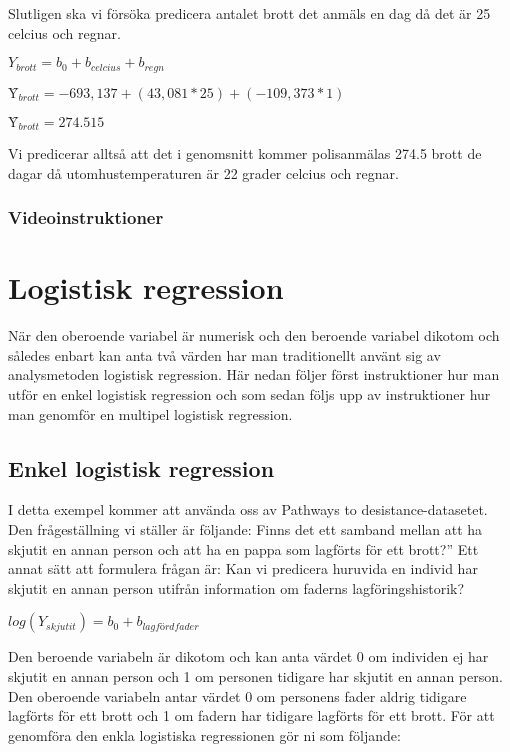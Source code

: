 \documentclass[
]{book}
\begin{document}
Slutligen ska vi försöka predicera antalet brott det anmäls en dag då det är 25 celcius och regnar.

\(Y_{brott} = b_0 + b_{celcius} + b_{regn}\)

\(Ŷ_{brott} = -693,137 + (43,081*25) + (-109,373*1)\)

\(Ŷ_{brott} = 274.515\)

Vi predicerar alltså att det i genomsnitt kommer polisanmälas 274.5 brott de dagar då utomhustemperaturen är 22 grader celcius och regnar.

\hypertarget{videoinstruktioner-11}{%
\subsection{Videoinstruktioner}\label{videoinstruktioner-11}}

\hypertarget{logistisk-regression}{%
\chapter{Logistisk regression}\label{logistisk-regression}}

När den oberoende variabel är numerisk och den beroende variabel dikotom och således enbart kan anta två värden har man traditionellt använt sig av analysmetoden logistisk regression.
Här nedan följer först instruktioner hur man utför en enkel logistisk regression och som sedan följs upp av instruktioner hur man genomför en multipel logistisk regression.

\hypertarget{enkel-logistisk-regression}{%
\section{Enkel logistisk regression}\label{enkel-logistisk-regression}}

I detta exempel kommer att använda oss av Pathways to desistance-datasetet. Den frågeställning vi ställer är följande: Finns det ett samband mellan att ha skjutit en annan person och att ha en pappa som lagförts för ett brott?'' Ett annat sätt att formulera frågan är: Kan vi predicera huruvida en individ har skjutit en annan person utifrån information om faderns lagföringshistorik?

\(log(Y_{skjutit}) = b_0 + b_{lagfördfader}\)

Den beroende variabeln är dikotom och kan anta värdet 0 om individen ej har skjutit en annan person och 1 om personen tidigare har skjutit en annan person. Den oberoende variabeln antar värdet 0 om personens fader aldrig tidigare lagförts för ett brott och 1 om fadern har tidigare lagförts för ett brott. För att genomföra den enkla logistiska regressionen gör ni som följande:
\end{document}
